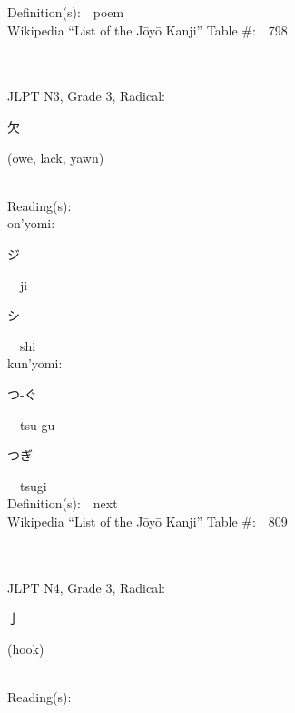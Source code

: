 \begin{multicols}{2}
Definition(s):\ \ poem \\
Wikipedia ``List of the J\=oy\=o Kanji'' Table \#:\ \ 798 \\
\ \ \\
{\fontsize{34pt}{40pt}  }\ \ \\  %
{JLPT N3, Grade 3, Radical:\ \ {\begin{CJK}{UTF8}{min} 欠 \end{CJK}} (owe, lack, yawn) } \\
Reading(s):\ \ \\
{\hspace*{1em}}on'yomi:\ \ \\
{\hspace*{2em}}{\begin{CJK}{UTF8}{min} ジ \end{CJK}}\ \ ji\ \ \\
{\hspace*{2em}}{\begin{CJK}{UTF8}{min} シ \end{CJK}}\ \ shi\ \ \\
{\hspace*{1em}}kun'yomi:\ \ \\
{\hspace*{2em}}{\begin{CJK}{UTF8}{min} つ-ぐ \end{CJK}}\ \ tsu-gu\ \ \\
{\hspace*{2em}}{\begin{CJK}{UTF8}{min} つぎ \end{CJK}}\ \ tsugi\ \ \\
Definition(s):\ \ next \\
Wikipedia ``List of the J\=oy\=o Kanji'' Table \#:\ \ 809 \\
\ \ \\
{\fontsize{34pt}{40pt}  }\ \ \\  %
{JLPT N4, Grade 3, Radical:\ \ {\begin{CJK}{UTF8}{min} 亅 \end{CJK}} (hook) } \\
Reading(s):\ \ \\

\end{multicols}
